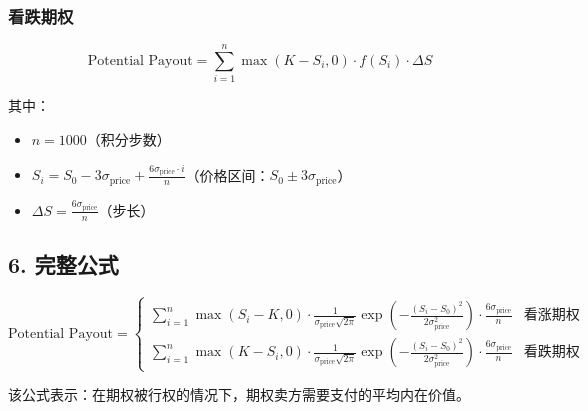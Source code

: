 \documentclass{article}
\begin{document}
\subsubsection{看跌期权}
\[
\text{Potential Payout} = \sum_{i=1}^{n} \max(K - S_i, 0) \cdot f(S_i) \cdot \Delta S
\]

其中：
\begin{itemize}
    \item $n = 1000$（积分步数）
    \item $S_i = S_0 - 3\sigma_{\text{price}} + \frac{6\sigma_{\text{price}} \cdot i}{n}$（价格区间：$S_0 \pm 3\sigma_{\text{price}}$）
    \item $\Delta S = \frac{6\sigma_{\text{price}}}{n}$（步长）
\end{itemize}

\subsection{6. 完整公式}
\[
\text{Potential Payout} = 
\begin{cases} 
\sum_{i=1}^{n} \max(S_i - K, 0) \cdot \frac{1}{\sigma_{\text{price}} \sqrt{2\pi}} \exp\left(-\frac{(S_i - S_0)^2}{2\sigma_{\text{price}}^2}\right) \cdot \frac{6\sigma_{\text{price}}}{n} & \text{看涨期权} \\
\sum_{i=1}^{n} \max(K - S_i, 0) \cdot \frac{1}{\sigma_{\text{price}} \sqrt{2\pi}} \exp\left(-\frac{(S_i - S_0)^2}{2\sigma_{\text{price}}^2}\right) \cdot \frac{6\sigma_{\text{price}}}{n} & \text{看跌期权}
\end{cases}
\]

该公式表示：在期权被行权的情况下，期权卖方需要支付的平均内在价值。
\end{document}
